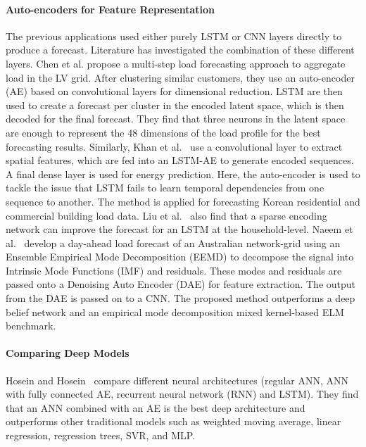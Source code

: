 \paragraph{Auto-encoders for Feature Representation} The previous applications used either purely LSTM or CNN layers directly to produce a forecast. Literature has investigated the combination of these different layers. Chen et al.\cite{chen2019daa} propose a multi-step load forecasting approach to aggregate load in the LV grid. After clustering similar customers, they use an auto-encoder (AE) based on convolutional layers for dimensional reduction. LSTM are then used to create a forecast per cluster in the encoded latent space, which is then decoded for the final forecast. They find that three neurons in the latent space are enough to represent the 48 dimensions of the load profile for the best forecasting results. Similarly, Khan et al.~\cite{khan2020tee} use a convolutional layer to extract spatial features, which are fed into an LSTM-AE to generate encoded sequences. A final dense layer is used for energy prediction. Here, the auto-encoder is used to tackle the issue that LSTM fails to learn temporal dependencies from one sequence to another. The method is applied for forecasting Korean residential and commercial building load data. Liu et al.~\cite{liu2019tsh} also find that a sparse encoding network can improve the forecast for an LSTM at the household-level. Naeem et al.~\cite{naeem2020stl} develop a day-ahead load forecast of an Australian network-grid using an Ensemble Empirical Mode Decomposition (EEMD) to decompose the signal into Intrinsic Mode Functions (IMF) and residuals. These modes and residuals are passed onto a Denoising Auto Encoder (DAE) for feature extraction. The output from the DAE is passed on to a CNN. The proposed method outperforms a deep belief network and an empirical mode decomposition mixed kernel-based ELM benchmark. %

\paragraph{Comparing Deep Models} Hosein and Hosein~\cite{Hosein2017lfu} compare different neural architectures (regular ANN, ANN with fully connected AE, recurrent neural network (RNN) and LSTM). They find that an ANN combined with an AE is the best deep architecture and outperforms other traditional models such as weighted moving average, linear regression, regression trees, SVR, and MLP.


